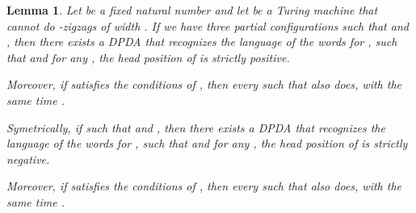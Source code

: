 \documentclass{llncs}
\newtheorem{lem}{Lemma}
\begin{document}
\begin{lem}\label{l:LRcycleDPDA}
Let  be a fixed natural number and let  be a Turing machine that cannot do -zigzags of width .
If we have three partial configurations  such that  and , then there exists a DPDA  that recognizes the language  of the words  for ,  such that  and for any , the head position of  is strictly positive.

Moreover, if  satisfies the conditions of , then every  such that  also does, with the same time .

Symetrically, if  such that  and , then there exists a DPDA  that recognizes the language  of the words  for ,  such that  and for any , the head position of  is strictly negative.

Moreover, if  satisfies the conditions of , then every  such that  also does, with the same time .
\end{lem}
\end{document}
